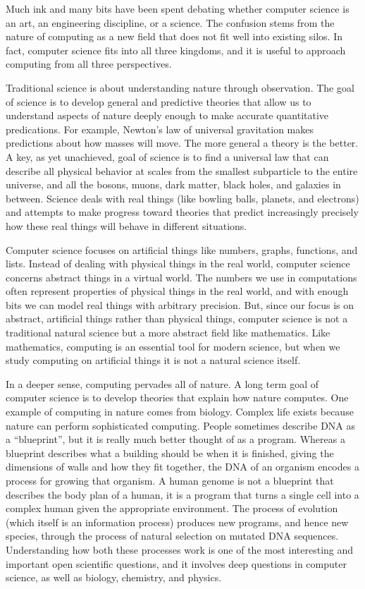 Much ink and many bits have been spent debating whether computer science is an art, an engineering discipline, or a science.  The confusion stems from the nature of computing as a new field that does not fit well into existing silos.  In fact, computer science fits into all three kingdoms, and it is useful to approach computing from all three perspectives.   

 Traditional science is about understanding nature through observation.  The goal of science is to develop general and predictive theories that allow us to understand aspects of nature deeply enough to make accurate quantitative predications.  For example, Newton's law of universal gravitation makes predictions about how masses will move.  The more general a theory is the better.  A key, as yet unachieved, goal of science is to find a universal law that can describe all physical behavior at scales from the smallest subparticle to the entire universe, and all the bosons, muons, dark matter, black holes, and galaxies in between.  Science deals with real things (like bowling balls, planets, and electrons) and attempts to make progress toward theories that predict increasingly precisely how these real things will behave in different situations.

Computer science focuses on artificial things like numbers, graphs, functions, and lists.  Instead of dealing with physical things in the real world, computer science concerns abstract things in a virtual world.  The numbers we use in computations often represent properties of physical things in the real world, and with enough bits we can model real things with arbitrary precision.  But, since our focus is on abstract, artificial things rather than physical things, computer science is not a traditional natural science but a more abstract field like mathematics.  Like mathematics, computing is an essential tool for modern science, but when we study computing on artificial things it is not a natural science itself.

In a deeper sense, computing pervades all of nature.  A long term goal of computer science is to develop theories that explain how nature computes.  One example of computing in nature comes from biology.  Complex life exists because nature can perform sophisticated computing.  People sometimes describe DNA as a ``blueprint'', but it is really much better thought of as a program.  Whereas a blueprint describes what a building should be when it is finished, giving the dimensions of walls and how they fit together, the DNA of an organism encodes a process for growing that organism.  A human genome is not a blueprint that describes the body plan of a human, it is a program that turns a single cell into a complex human given the appropriate environment.  The process of evolution (which itself is an information process) produces new programs, and hence new species, through the process of natural selection on mutated DNA sequences.  Understanding how both these processes work is one of the most interesting and important open scientific questions, and it involves deep questions in computer science, as well as biology, chemistry, and physics.

